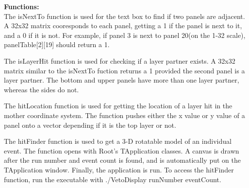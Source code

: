 \documentclass[a4paper,12pt]{article}
\begin{document}
\textbf{Functions:} \\
	The isNextTo function is used for the text box to find if two panels are adjacent. A 32x32 matrix cooresponds to each panel, getting a 1 if the panel is next to it, and a 0 if it is not. For example, if panel 3 is next to panel 20(on the 1-32 scale), panelTable[2][19] should return a 1. 

The isLayerHit function is used for checking if a layer partner exists. A 32x32 matrix similar to the isNextTo fuction returns a 1 provided the second panel is a layer partner. The bottom and upper panels have more than one layer partner, whereas the sides do not.

The hitLocation function is used for getting the location of a layer hit in the mother coordinate system. The function pushes either the x value or y value of a panel onto a vector depending if it is the top layer or not.

The hitFinder function is used to get a 3-D rotatable model of an individual event. The function opens with Root's TApplication classes. A canvas is drawn after the run number and event count is found, and is automatically put on the TApplication window. Finally, the application is run. To access the hitFinder function, run the executable with ./VetoDisplay runNumber eventCount. 

\pagebreak
\end{document}
